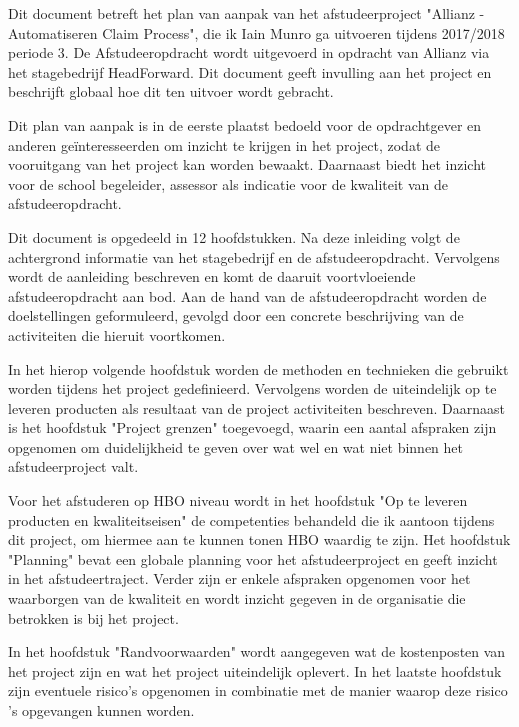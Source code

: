 Dit document betreft het plan van aanpak van het afstudeerproject "Allianz - Automatiseren Claim Process", die ik Iain Munro ga uitvoeren tijdens 2017/2018 periode 3. De Afstudeeropdracht wordt uitgevoerd in opdracht van Allianz via het stagebedrijf HeadForward. Dit document geeft invulling aan het project en beschrijft globaal hoe dit ten uitvoer wordt gebracht.

Dit plan van aanpak is in de eerste plaatst bedoeld voor de opdrachtgever en anderen geïnteresseerden om inzicht te krijgen in het project, zodat de vooruitgang van het project kan worden bewaakt. Daarnaast biedt het inzicht voor de school begeleider, assessor als indicatie voor de kwaliteit van de afstudeeropdracht.

Dit document is opgedeeld in 12 hoofdstukken. Na deze inleiding volgt de achtergrond informatie van het stagebedrijf en de afstudeeropdracht. Vervolgens wordt de aanleiding beschreven en komt de daaruit voortvloeiende afstudeeropdracht aan bod. Aan de hand van de afstudeeropdracht worden de doelstellingen geformuleerd, gevolgd door een concrete beschrijving van de activiteiten die hieruit voortkomen.

In het hierop volgende hoofdstuk worden de methoden en technieken die gebruikt worden tijdens het project gedefinieerd. Vervolgens worden de uiteindelijk op te leveren producten als resultaat van de project activiteiten beschreven. Daarnaast is het hoofdstuk "Project grenzen" toegevoegd, waarin een aantal afspraken zijn opgenomen om duidelijkheid te geven over wat wel en wat niet binnen het afstudeerproject valt.

Voor het afstuderen op HBO niveau wordt in het hoofdstuk "Op te leveren producten en kwaliteitseisen" de competenties behandeld die ik aantoon tijdens dit project, om hiermee aan te kunnen tonen HBO waardig te zijn. Het hoofdstuk "Planning" bevat een globale planning voor het afstudeerproject en geeft inzicht in het afstudeertraject. Verder zijn er enkele afspraken opgenomen voor het waarborgen van de kwaliteit en wordt inzicht gegeven in de organisatie die betrokken is bij het project.

In het hoofdstuk "Randvoorwaarden" wordt aangegeven wat de kostenposten van het project zijn en wat het project uiteindelijk oplevert. In het laatste hoofdstuk zijn eventuele risico's opgenomen in combinatie met de manier waarop deze risico 's opgevangen kunnen worden.
